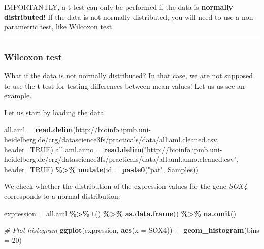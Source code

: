 \documentclass[
]{book}
\newenvironment{Shaded}{\begin{snugshade}}{\end{snugshade}}
\newcommand{\AttributeTok}[1]{\textcolor[rgb]{0.13,0.29,0.53}{#1}}
\newcommand{\CommentTok}[1]{\textcolor[rgb]{0.56,0.35,0.01}{\textit{#1}}}
\newcommand{\ConstantTok}[1]{\textcolor[rgb]{0.56,0.35,0.01}{#1}}
\newcommand{\DecValTok}[1]{\textcolor[rgb]{0.00,0.00,0.81}{#1}}
\newcommand{\FunctionTok}[1]{\textcolor[rgb]{0.13,0.29,0.53}{\textbf{#1}}}
\newcommand{\NormalTok}[1]{#1}
\newcommand{\OtherTok}[1]{\textcolor[rgb]{0.56,0.35,0.01}{#1}}
\newcommand{\SpecialCharTok}[1]{\textcolor[rgb]{0.81,0.36,0.00}{\textbf{#1}}}
\newcommand{\StringTok}[1]{\textcolor[rgb]{0.31,0.60,0.02}{#1}}
\begin{document}
IMPORTANTLY, a t-test can only be performed if the data is \textbf{normally distributed}!
If the data is not normally distributed, you will need to use a non-parametric test, like Wilcoxon test.

\begin{center}\rule{0.5\linewidth}{0.5pt}\end{center}

\hypertarget{wilcoxon-test}{%
\subsubsection{Wilcoxon test}\label{wilcoxon-test}}

What if the data is not normally distributed?
In that case, we are not supposed to use the t-test for testing differences between mean values!
Let us us see an example.

Let us start by loading the data.

\begin{Shaded}
\begin{Highlighting}[]
\NormalTok{all.aml }\OtherTok{=} \FunctionTok{read.delim}\NormalTok{(}\StringTok{\textquotesingle{}http://bioinfo.ipmb.uni{-}heidelberg.de/crg/datascience3fs/practicals/data/all.aml.cleaned.csv\textquotesingle{}}\NormalTok{,}
                     \AttributeTok{header=}\ConstantTok{TRUE}\NormalTok{)}
\NormalTok{all.aml.anno }\OtherTok{=} \FunctionTok{read.delim}\NormalTok{(}\StringTok{"http://bioinfo.ipmb.uni{-}heidelberg.de/crg/datascience3fs/practicals/data/all.aml.anno.cleaned.csv"}\NormalTok{,}
                          \AttributeTok{header=}\ConstantTok{TRUE}\NormalTok{) }\SpecialCharTok{\%\textgreater{}\%}
  \FunctionTok{mutate}\NormalTok{(}\AttributeTok{id =} \FunctionTok{paste0}\NormalTok{(}\StringTok{"pat"}\NormalTok{, Samples))}
\end{Highlighting}
\end{Shaded}

We check whether the distribution of the expression values for the gene \emph{SOX4} corresponds to a normal distribution:

\begin{Shaded}
\begin{Highlighting}[]
\NormalTok{expression }\OtherTok{=}\NormalTok{ all.aml }\SpecialCharTok{\%\textgreater{}\%}
  \FunctionTok{t}\NormalTok{() }\SpecialCharTok{\%\textgreater{}\%}
  \FunctionTok{as.data.frame}\NormalTok{() }\SpecialCharTok{\%\textgreater{}\%}
  \FunctionTok{na.omit}\NormalTok{()}

\CommentTok{\# Plot histogram }
\FunctionTok{ggplot}\NormalTok{(expression,}
       \FunctionTok{aes}\NormalTok{(}\AttributeTok{x =}\NormalTok{ SOX4)) }\SpecialCharTok{+}
  \FunctionTok{geom\_histogram}\NormalTok{(}\AttributeTok{bins =} \DecValTok{20}\NormalTok{)}
\end{Highlighting}
\end{Shaded}
\end{document}
